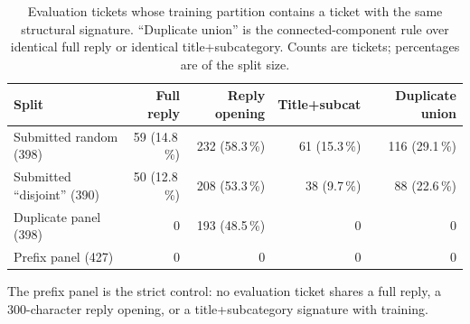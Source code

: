 
\begin{table}[t]
\centering
\begin{threeparttable}
\caption{Evaluation tickets whose training partition contains a ticket with the
same structural signature. ``Duplicate union'' is the connected-component rule
over identical full reply or identical title+subcategory. Counts are tickets;
percentages are of the split size.}
\label{tab:overlap}
\begin{tabular}{@{}lrrrr@{}}
\toprule
Split & Full reply & Reply opening & Title+subcat & Duplicate union \\
\midrule
Submitted random (398)   & 59 (14.8\,\%) & 232 (58.3\,\%) & 61 (15.3\,\%) & 116 (29.1\,\%) \\
Submitted ``disjoint'' (390) & 50 (12.8\,\%) & 208 (53.3\,\%) & 38 (9.7\,\%) & 88 (22.6\,\%) \\
Duplicate panel (398)    & 0 & 193 (48.5\,\%) & 0 & 0 \\
Prefix panel (427)       & 0 & 0 & 0 & 0 \\
\bottomrule
\end{tabular}
\begin{tablenotes}[flushleft]
\footnotesize
\item The prefix panel is the strict control: no evaluation ticket shares a full
reply, a 300-character reply opening, or a title+subcategory signature with
training.
\end{tablenotes}
\end{threeparttable}
\end{table}

